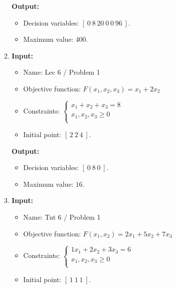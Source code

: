 \documentclass{article}
\begin{document}
\begin{enumerate}[label={(\arabic*)}, itemsep=0.25in]
          \textbf{Output:}
          \begin{itemize}
              \item Decision variables: \([ \ 0 \ 8 \ 20 \ 0 \ 0 \ 96 \ ]\).
              \item Maximum value: \(400\).
          \end{itemize}

    \item \textbf{Input:}
          \begin{itemize}
              \item Name: Lec 6 / Problem 1
              \item Objective function: \(F(x_1, x_2, x_3) =  x_1 + 2 x_2\)
              \item Constraints: \(\begin{cases}
                        x_1 + x_2 + x_3 = 8 \\
                        x_1, x_2, x_3 \ge 0 \\
                    \end{cases}\)
              \item Initial point: \([ \ 2 \ 2 \ 4 \ ]\).
          \end{itemize}

          \textbf{Output:}
          \begin{itemize}
              \item Decision variables: \([ \ 0 \ 8 \ 0 \ ]\).
              \item Maximum value: \(16\).
          \end{itemize}

    \item \textbf{Input:}
          \begin{itemize}
              \item Name: Tut 6 / Problem 1
              \item Objective function: \(F(x_1, x_2) = 2 x_1 + 5 x_2 + 7 x_3\)
              \item Constraints: \(\begin{cases}
                        1 x_1 + 2 x_2 + 3 x_3 = 6 \\
                        x_1, x_2, x_3 \ge 0       \\
                    \end{cases}\)
              \item Initial point: \([ \ 1 \ 1 \ 1 \ ]\).
          \end{itemize}


\end{enumerate}
\end{document}
